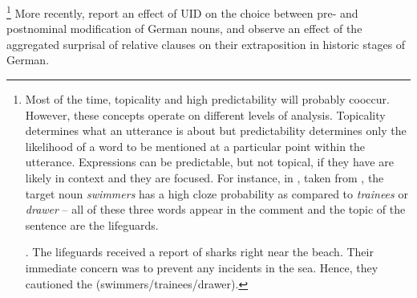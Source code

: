 %
\footnote{Most of the time, topicality and high predictability will probably cooccur. However, these concepts operate on different levels of analysis. Topicality determines what an utterance is about \citep{reinhart1981, krifka2007} but predictability determines only the likelihood of a word to be mentioned at a particular point within the utterance. Expressions can be predictable, but not topical, if they have are likely in context and they are focused. For instance, in \Next, taken from \citet{kuperberg.etal2020}, the target noun \textit{swimmers} has a high cloze probability as compared to \textit{trainees} or \textit{drawer} -- all of these three words appear in the comment and the topic of the sentence are the lifeguards.

\ex. The lifeguards received a report of sharks right near the beach. Their immediate concern was to prevent any incidents in the sea. Hence, they cautioned the (swimmers/trainees/drawer).

}\afterfn%
% 
More recently, \citet{sikos.etal2017} report an effect of UID on the choice between pre- and postnominal modification of German nouns, and \citet{speyer.lemke2017} observe an effect of the aggregated surprisal of relative clauses on their extraposition in historic stages of German.


